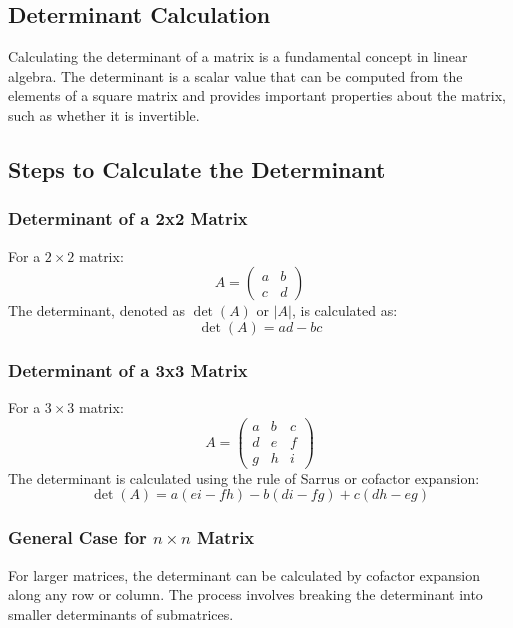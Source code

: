 \subsection{Determinant Calculation} \label{Determinant Calculation }

Calculating the determinant of a matrix is a fundamental concept in linear algebra. The determinant is a scalar value that can be computed from the elements of a square matrix and provides important properties about the matrix, such as whether it is invertible.

\subsection*{Steps to Calculate the Determinant}

\subsubsection*{Determinant of a 2x2 Matrix}
For a $2 \times 2$ matrix:
\[
A = \begin{pmatrix}
a & b \\
c & d
\end{pmatrix}
\]
The determinant, denoted as $\det(A)$ or $|A|$, is calculated as:
\[
\det(A) = ad - bc
\]

\subsubsection*{Determinant of a 3x3 Matrix}
For a $3 \times 3$ matrix:
\[
A = \begin{pmatrix}
a & b & c \\
d & e & f \\
g & h & i
\end{pmatrix}
\]
The determinant is calculated using the rule of Sarrus or cofactor expansion:
\[
\det(A) = a(ei - fh) - b(di - fg) + c(dh - eg)
\]

\subsubsection*{General Case for $n \times n$ Matrix}
For larger matrices, the determinant can be calculated by cofactor expansion along any row or column. The process involves breaking the determinant into smaller determinants of submatrices.
